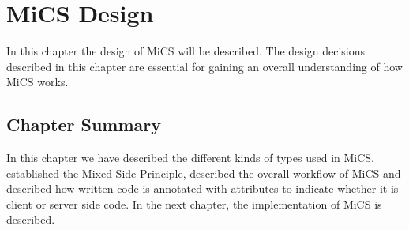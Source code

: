 \chapter{MiCS Design}

In this chapter the design of MiCS will be described. The design decisions described in this chapter are essential for gaining an overall understanding of how MiCS works.











\section{Chapter Summary} %
\label{sec:chapter_design_summary}
In this chapter we have described the different kinds of types used in MiCS, established the Mixed Side Principle, described the overall workflow of MiCS and described how written code is annotated with attributes to indicate whether it is client or server side code. In the next chapter, the implementation of MiCS is described.
